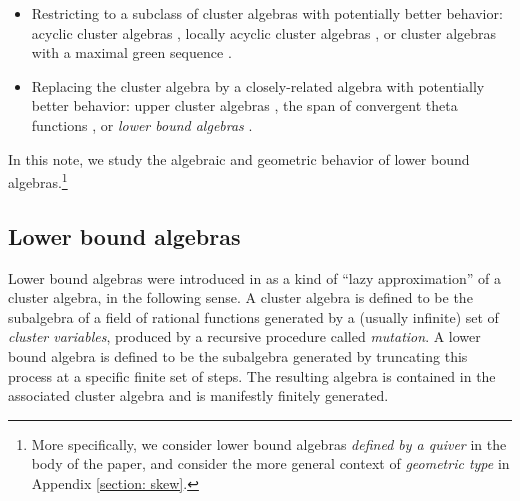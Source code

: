 \documentclass[ALCO,published]{cedram}
\numberwithin{equation}{section}
\newcommand{\1}{^{-1}}
\begin{document}
\begin{itemize}
	\item Restricting to a subclass of cluster algebras with potentially better behavior: acyclic cluster algebras \cite{BFZ05}, locally acyclic cluster algebras \cite{MulLA,BMRS15}, or cluster algebras with a maximal green sequence \cite{BDP14,MulMGS}.
	\item Replacing the cluster algebra by a closely-related algebra with potentially better behavior: upper cluster algebras \cite{BFZ05,BMRS15}, the span of convergent theta functions \cite{GHKK}, or \textit{lower bound algebras} \cite{BFZ05}.
\end{itemize}
In this note, we study the algebraic and geometric behavior of lower bound algebras.\footnote{More specifically, we consider lower bound algebras \emph{defined by a quiver} in the body of the paper, and consider the more general context of \emph{geometric type} in Appendix \ref{section: skew}.}


\subsection{Lower bound algebras}

Lower bound algebras were introduced in \cite{BFZ05} as a kind of ``lazy approximation'' of a cluster algebra, in the following sense.  A cluster algebra is defined to be the subalgebra of a field of rational functions generated by a (usually infinite) set of \emph{cluster variables}, produced by a recursive procedure called \emph{mutation}.  A lower bound algebra is defined to be the subalgebra generated by truncating this process at a specific finite set of steps.  The resulting algebra is contained in the associated cluster algebra and is manifestly finitely generated.
\end{document}
